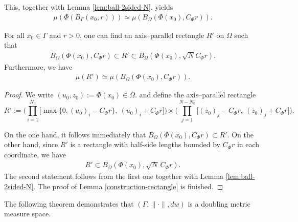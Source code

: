 \documentclass[12pt]{amsart}
\begin{document}
This, together with Lemma  \ref{lem:ball-2sided-N}, yields
\begin{align}\label{doublingball}
  \mu(\Phi(B_{\Gamma}(x_0,r))) \simeq \mu(B_{\Omega}(\Phi(x_0),C_\Phi r)).
\end{align}
\begin{lemma}\label{construction-rectangle}
  For all $x_0\in\Gamma$ and $r>0$, one can find an axis--parallel rectangle $R'$ on $\Omega$ such that
\begin{align}\label{step3goal}
B_{\Omega}(\Phi(x_0),C_\Phi r)\subset R'\subset B_{\Omega}(\Phi(x_0),\sqrt{N}C_\Phi r).
\end{align}
Furthermore, we have
\begin{align}\label{Rdoubling}
  \mu(R')\simeq \mu(B_{\Omega}(\Phi(x_0),C_\Phi r)).
\end{align}
\end{lemma}
\begin{proof}
We write
$
(u_0,z_0):=\Phi(x_0)\in\Omega.
$
and define the axis--parallel rectangle
\begin{equation}\label{eq:rectangle-choice}
R':=\Big(\prod_{i=1}^{N_{0}} \big[\max\{0,(u_0)_i-C_\Phi r\},\ (u_0)_i+C_\Phi r\big]\Big)
\times
\Big(\prod_{j=1}^{N-N_{0}}\big[(z_0)_j-C_\Phi r,\ (z_0)_j+C_\Phi r\big]\Big).
\end{equation}

On the one hand, it follows immediately that $B_\Omega(\Phi(x_0),C_\Phi r)\subset R'$. On the other hand, since $R'$ is a rectangle with half-side lengths bounded by $C_\Phi r$ in each coordinate, we have
\begin{align*}
R'\subset B_\Omega(\Phi(x_0),\sqrt{N}\,C_\Phi r).
\end{align*}
The second statement follows from the first one together with Lemma \ref{lem:ball-2sided-N}. The proof of Lemma \ref{construction-rectangle} is finished.
\end{proof}
The following theorem demonstrates that $(\Gamma,\|\cdot\|,dw)$ is a doubling metric measure space.
\end{document}
